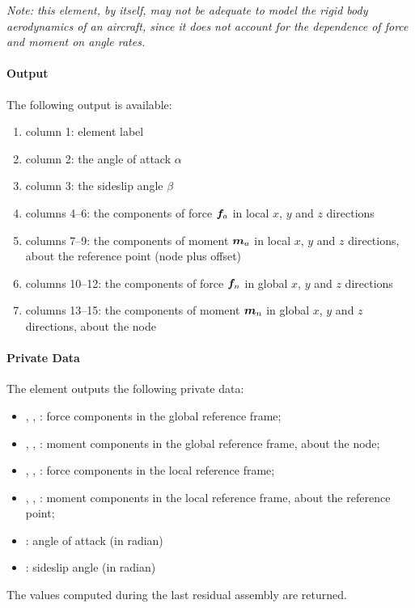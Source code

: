 \emph{Note: this element, by itself, may not be adequate to model
the rigid body aerodynamics of an aircraft, since it does not
account for the dependence of force and moment on angle rates.}

\paragraph{Output}
The following output is available:
\begin{enumerate}
\item column 1: element label
\item column 2: the angle of attack $\alpha$
\item column 3: the sideslip angle $\beta$
\item columns 4--6: the components of force $\boldsymbol{f}_a$
	in local $x$, $y$ and $z$ directions
\item columns 7--9: the components of moment $\boldsymbol{m}_a$
	in local $x$, $y$ and $z$ directions,
	about the reference point (node plus offset)
\item columns 10--12: the components of force $\boldsymbol{f}_n$
	in global $x$, $y$ and $z$ directions
\item columns 13--15: the components of moment $\boldsymbol{m}_n$
	in global $x$, $y$ and $z$ directions,
	about the node
\end{enumerate}

\paragraph{Private Data}
The  element outputs the following private data:
\begin{itemize}
\item {}, , :
	force components in the global reference frame;

\item {}, , :
	moment components in the global reference frame, about the node;

\item {}, , :
	force components in the local reference frame;

\item {}, , :
	moment components in the local reference frame, about the reference point;

\item {}: angle of attack (in radian)

\item {}: sideslip angle (in radian)
\end{itemize}
The values computed during the last residual assembly are returned.

